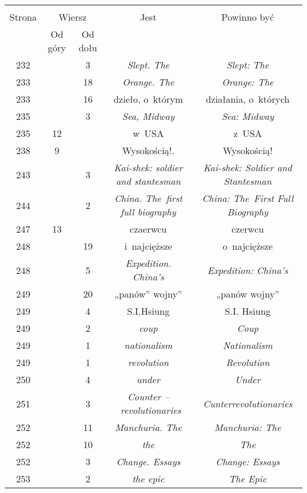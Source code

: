 \documentclass[a4paper,11pt]{article}
\begin{document}
\begin{center}
  \begin{tabular}{|c|c|c|c|c|}
    \hline
    & \multicolumn{2}{c|}{} & & \\
    Strona & \multicolumn{2}{c|}{Wiersz} & Jest
                              & Powinno być \\ \cline{2-3}
    & Od góry & Od dołu & & \\
    \hline
    232 & &  3 & \textit{Slept. The} & \textit{Slept: The} \\
    233 & & 18 & \textit{Orange. The} & \textit{Orange: The} \\
    233 & & 16 & dzieło, o~którym & działania, o~których \\
    235 & &  3 & \textit{Sea, Midway} & \textit{Sea: Midway} \\
    235 & 12 & & w~USA & z~USA \\
    238 &  9 & & Wysokością!. & Wysokością! \\
    243 & &  3 & \textit{Kai-shek: soldier and stantesman}
           & \textit{Kai-shek: Soldier and Stantesman} \\
    244 & &  2 & \textit{China. The~first full biography}
           & \textit{China: The~First Full Biography} \\
    247 & 13 & & czaerwcu & czerwcu \\
    248 & & 19 & i~najcięższe & o~najcięższe \\
    248 & &  5 & \textit{Expedition. China's}
           & \textit{Expedition: China's} \\
    249 & & 20 & „panów” wojny” & „panów wojny” \\
    249 & &  4 & S.I.Hsiung & S.I. Hsiung \\
    249 & &  2 & \textit{coup} & \textit{Coup} \\
    249 & &  1 & \textit{nationalism} & \textit{Nationalism} \\
    249 & &  1 & \textit{revolution} & \textit{Revolution} \\
    250 & &  4 & \textit{under} & \textit{Under} \\
    251 & &  3 & \textit{Counter --~revolutionaries}
           & \textit{Cunterrevolutionaries} \\
    252 & & 11 & \textit{Manchuria. The} & \textit{Manchuria: The} \\
    252 & & 10 & \textit{the} & \textit{The} \\
    252 & &  3 & \textit{Change. Essays} & \textit{Change: Essays} \\
    253 & &  2 & \textit{the epic} & \textit{The Epic} \\

\end{tabular}
\end{center}
\end{document}
